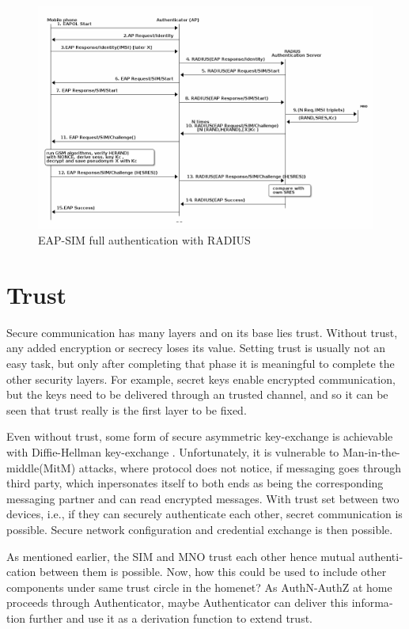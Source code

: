 \documentclass[12pt,a4paper,english]{tutthesis}
\begin{document}
\begin{otherlanguage}{english}
\begin{figure}[htb]
\centering
\includegraphics[width=.9\linewidth]{eap-sim-radius.png}
\caption{\label{fig:eap-sim-radius}EAP-SIM full authentication with RADIUS}
\end{figure}
\section{Trust}
\label{sec-2-6}

Secure communication has many layers and on its base lies trust. Without
trust, any added encryption or secrecy loses its value. 
Setting trust is usually not an easy task, but only after
completing that phase it is meaningful to complete the other security
layers.
For example, secret keys enable encrypted communication, but the keys need to be
delivered through an trusted channel, and so it can be seen that trust
really is the first layer to be fixed. 



Even without trust, some form of secure asymmetric key-exchange is achievable
with Diffie-Hellman key-exchange \cite{diffie1976new}. Unfortunately, it is vulnerable
to Man-in-the-middle(MitM) attacks, where protocol does not notice, 
if messaging goes through third party, which inpersonates itself to 
both ends as being the corresponding messaging partner and can
read encrypted messages.
With trust set between two devices, i.e.,  if they can securely
authenticate each other, secret communication is possible. 
Secure network configuration and credential exchange is then possible.


As mentioned earlier, the SIM and MNO trust each other hence
mutual authentication between them is possible.  Now, how this could be used
to include other components under same trust circle in the homenet? 
As AuthN-AuthZ at home proceeds through Authenticator, maybe
Authenticator  can deliver this information further and use it as a
 derivation function to extend trust.


\end{otherlanguage}
\end{document}
